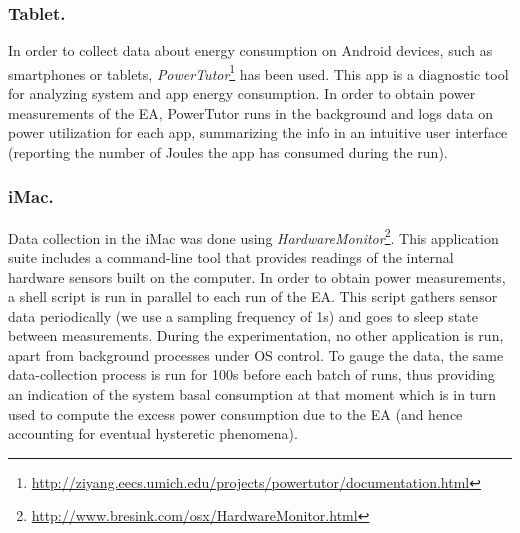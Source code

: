 

\subsubsection*{Tablet.}
In order to collect data about energy consumption on Android devices, such as smartphones or tablets, \emph{PowerTutor}\footnote{\url{http://ziyang.eecs.umich.edu/projects/powertutor/documentation.html}} \cite{powertutor2} has been used. 
This app is a diagnostic tool for analyzing system and app energy consumption.
In order to obtain power measurements of the EA, PowerTutor runs in the background and logs data on power utilization for each app, summarizing the info in an intuitive user interface (reporting the number of Joules the app has consumed during the run).


\subsubsection*{iMac.}
Data collection in the iMac was done using \emph{HardwareMonitor}\footnote{\url{http://www.bresink.com/osx/HardwareMonitor.html}}. 
This application suite includes a command-line tool that provides readings of the internal
hardware sensors built on the computer. In order to obtain power measurements, a shell
script is run in parallel to each run of the EA. This script gathers sensor data periodically
(we use a sampling frequency of 1s) and goes to sleep state between measurements. 
During the experimentation, no other application is run, apart from background processes 
under OS control. 
To gauge the data,
the same data-collection process is run for 100s before each batch of runs, thus providing
an indication of the system basal consumption at that moment which is in turn used to 
compute the excess power consumption due to the EA (and hence accounting for
eventual hysteretic phenomena).

